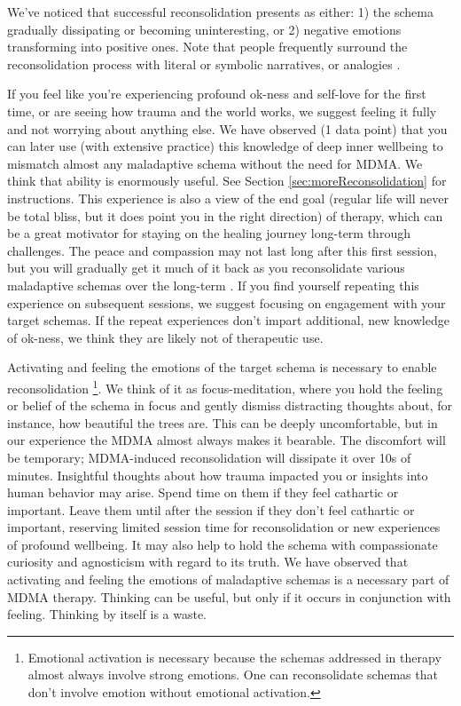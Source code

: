 \documentclass[12pt,letterpaper]{book}
\begin{document}
We've noticed that successful reconsolidation presents as either: 1) the schema gradually dissipating or becoming uninteresting, or 2) negative emotions transforming into positive ones. Note that people frequently surround the reconsolidation process with literal or symbolic narratives, or analogies \cite{eckerUnlocking}.

If you feel like you're experiencing profound ok-ness and self-love for the first time, or are seeing how trauma and the world works, we suggest feeling it fully and not worrying about anything else. We have observed (1 data point) that you can later use (with extensive practice) this knowledge of deep inner wellbeing to mismatch almost any maladaptive schema without the need for MDMA. We think that ability is enormously useful. See Section \ref{sec:moreReconsolidation} for instructions. This experience is also a view of the end goal (regular life will never be total bliss, but it does point you in the right direction) of therapy, which can be a great motivator for staying on the healing journey long-term through challenges. The peace and compassion may not last long after this first session, but you will gradually get it much of it back as you reconsolidate various maladaptive schemas over the long-term \cite{evansAfterglow}. If you find yourself repeating this experience on subsequent sessions, we suggest focusing on engagement with your target schemas. If the repeat experiences don't impart additional, new knowledge of ok-ness, we think they are likely not of therapeutic use.

Activating and feeling the emotions of the target schema is necessary to enable reconsolidation \cite{ecker2015misunderstood} \footnote{Emotional activation is necessary because the schemas addressed in therapy almost always involve strong emotions. One can reconsolidate schemas that don't involve emotion without emotional activation.}. We think of it as focus-meditation, where you hold the feeling or belief of the schema in focus and gently dismiss distracting thoughts about, for instance, how beautiful the trees are. This can be deeply uncomfortable, but in our experience the MDMA almost always makes it bearable. The discomfort will be temporary; MDMA-induced reconsolidation will dissipate it over 10s of minutes. Insightful thoughts about how trauma impacted you or insights into human behavior may arise. Spend time on them if they feel cathartic or important. Leave them until after the session if they don't feel cathartic or important, reserving limited session time for reconsolidation or new experiences of profound wellbeing. It may also help to hold the schema with compassionate curiosity and agnosticism with regard to its truth. We have observed that activating and feeling the emotions of maladaptive schemas is a necessary part of MDMA therapy. Thinking can be useful, but only if it occurs in conjunction with feeling. Thinking by itself is a waste.
\end{document}
